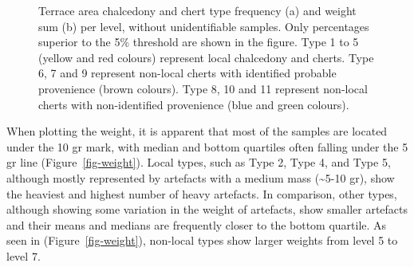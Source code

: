 \documentclass[
  a4paper,
  DIV=11,
  numbers=noendperiod]{scrreprt}
\begin{document}
\begin{figure}


\caption{\label{fig-type-per-level}Terrace area chalcedony and chert
type frequency (a) and weight sum (b) per level, without unidentifiable
samples. Only percentages superior to the 5\% threshold are shown in the
figure. Type 1 to 5 (yellow and red colours) represent local chalcedony
and cherts. Type 6, 7 and 9 represent non-local cherts with identified
probable provenience (brown colours). Type 8, 10 and 11 represent
non-local cherts with non-identified provenience (blue and green
colours).}

\end{figure}%

When plotting the weight, it is apparent that most of the samples are
located under the 10 gr mark, with median and bottom quartiles often
falling under the 5 gr line (Figure~\ref{fig-weight}). Local types, such
as Type 2, Type 4, and Type 5, although mostly represented by artefacts
with a medium mass (\textasciitilde5-10 gr), show the heaviest and
highest number of heavy artefacts. In comparison, other types, although
showing some variation in the weight of artefacts, show smaller
artefacts and their means and medians are frequently closer to the
bottom quartile. As seen in (Figure~\ref{fig-weight}), non-local types
show larger weights from level 5 to level 7.
\end{document}
